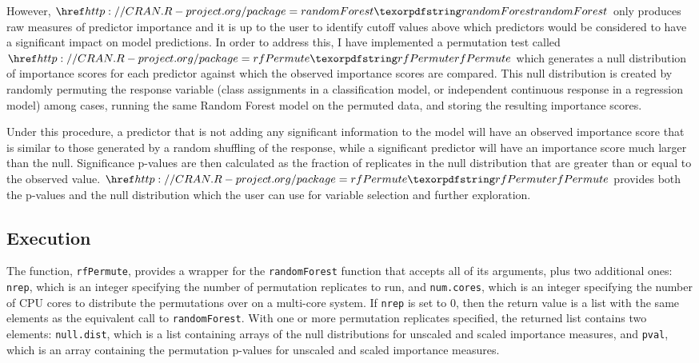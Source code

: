 However, \(\CRANpkg{randomForest}\) only produces raw measures of
predictor importance and it is up to the user to identify cutoff values
above which predictors would be considered to have a significant impact
on model predictions. In order to address this, I have implemented a
permutation test called \(\CRANpkg{rfPermute}\) which generates a null
distribution of importance scores for each predictor against which the
observed importance scores are compared. This null distribution is
created by randomly permuting the response variable (class assignments
in a classification model, or independent continuous response in a
regression model) among cases, running the same Random Forest model on
the permuted data, and storing the resulting importance scores.

Under this procedure, a predictor that is not adding any significant
information to the model will have an observed importance score that is
similar to those generated by a random shuffling of the response, while
a significant predictor will have an importance score much larger than
the null. Significance p-values are then calculated as the fraction of
replicates in the null distribution that are greater than or equal to
the observed value. \(\CRANpkg{rfPermute}\) provides both the p-values
and the null distribution which the user can use for variable selection
and further exploration.

\subsection{Execution}\label{execution}

The function, \texttt{rfPermute}, provides a wrapper for the
\texttt{randomForest} function that accepts all of its arguments, plus
two additional ones: \texttt{nrep}, which is an integer specifying the
number of permutation replicates to run, and \texttt{num.cores}, which
is an integer specifying the number of CPU cores to distribute the
permutations over on a multi-core system. If \texttt{nrep} is set to 0,
then the return value is a list with the same elements as the equivalent
call to \texttt{randomForest}. With one or more permutation replicates
specified, the returned list contains two elements: \texttt{null.dist},
which is a list containing arrays of the null distributions for unscaled
and scaled importance measures, and \texttt{pval}, which is an array
containing the permutation p-values for unscaled and scaled importance
measures.

